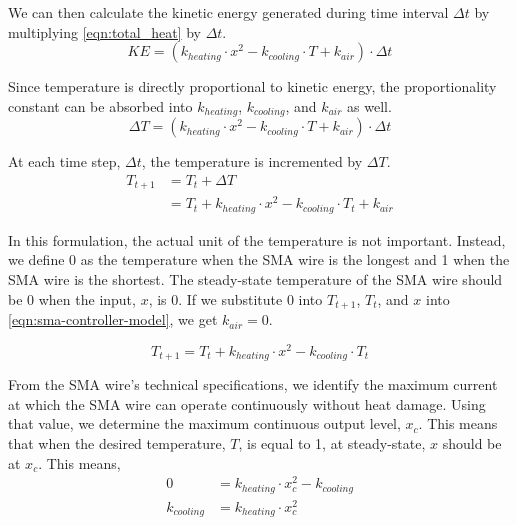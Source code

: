 We can then calculate the kinetic energy generated during time interval $\Delta t$ by multiplying \eqref{eqn:total_heat} by $\Delta t$.
\begin{equation}
KE =  (k_{heating} \cdot x^2 - k_{cooling} \cdot T + k_{air}) \cdot \Delta t \label{eqn:total_KE}
\end{equation}

Since temperature is directly proportional to kinetic energy, the proportionality constant can be absorbed into $k_{heating}$, $k_{cooling}$, and $ k_{air}$ as well. 
\begin{equation}
\Delta T =  (k_{heating} \cdot x^2 - k_{cooling} \cdot T  + k_{air}) \cdot \Delta t\label{eqn:delta_T}
\end{equation}

At each time step, $\Delta t$, the temperature is incremented by $\Delta T$.  
\begin{subequations}
	\begin{flalign}
	T_{t+1} &=  T_{t} + \Delta T \\
	&=  T_{t} + k_{heating} \cdot x^2 - k_{cooling} \cdot T_{t}  + k_{air}\label{eqn:sma-controller-model}
	\end{flalign}
\end{subequations}

In this formulation, the actual unit of the temperature is not important. Instead, we define 0 as the temperature when the SMA wire is the longest and 1 when the SMA wire is the shortest. The steady-state temperature of the SMA wire should be 0 when the input, $x$, is 0. If we substitute 0 into $T_{t+1}$, $T_{t}$, and $x$ into \eqref{eqn:sma-controller-model}, we get $k_{air} = 0$. 

\begin{equation}\label{eqn:sma-controller-model-1}
T_{t+1} =  T_{t} + k_{heating} \cdot x^2 - k_{cooling} \cdot T_{t}
\end{equation}

From the SMA wire's technical specifications\cite{FlexinolTechSpecs}, we identify the maximum current at which the SMA wire can operate continuously without heat damage. Using that value, we determine the maximum continuous output level, $x_c$. This means that when the desired temperature, $T$, is equal to 1, at steady-state, $x$ should be at $x_c$. This means, 
\begin{subequations}
	\begin{flalign}
	0 &= k_{heating} \cdot x_c^2 - k_{cooling} \\
	k_{cooling} &=  k_{heating} \cdot x_c^2\label{eqn:k_cooling}
	\end{flalign}
\end{subequations}

